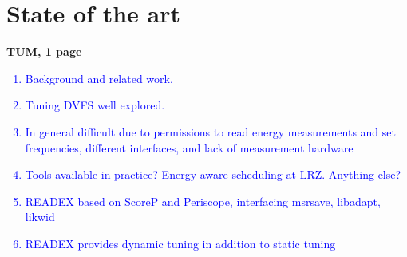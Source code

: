 \section{State of the art} \label{sec:related-work}
\textbf{TUM, 1 page} 

\textcolor{blue}{
\begin{enumerate}
  \item Background and related work.
  \item Tuning DVFS well explored. 
  \item In general difficult due to permissions to read energy measurements and set frequencies, different interfaces, and lack of measurement hardware
  \item Tools available in practice? Energy aware scheduling at LRZ. Anything else?
  \item READEX based on ScoreP and Periscope, interfacing msrsave, libadapt, likwid
  \item READEX provides dynamic tuning in addition to static tuning
\end{enumerate}
}
